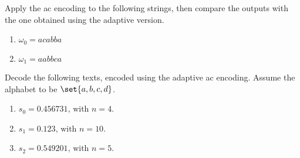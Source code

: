 \documentclass{subfiles}
\begin{document}
    \begin{exercise}
        Apply the \gls{ac} encoding to the following strings, 
            then compare the outputs with the one obtained using the adaptive version.
            \begin{enumerate}
                \item \(\omega_{0} = acabba\)
                \item \(\omega_{1} = aabbca\)
            \end{enumerate}
    \end{exercise}

    \begin{exercise}
        Decode the following texts, encoded using the adaptive \gls{ac} encoding.
        Assume the alphabet to be \(\set{a, b, c, d}\).
        \begin{enumerate}
            \item \(s_{0} = 0.456731 \text{, with } n = 4\).
            \item \(s_{1} = 0.123 \text{, with } n = 10\).
            \item \(s_{2} = 0.549201 \text{, with } n = 5\).
        \end{enumerate}
    \end{exercise}
\end{document}
